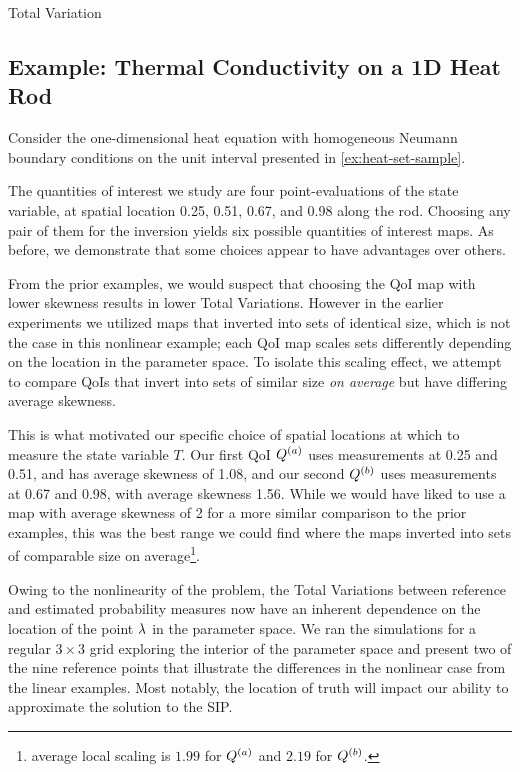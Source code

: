 Total Variation\subsection{Example: Thermal Conductivity on a 1D Heat Rod}\label{ex:heat-set-sample-accuracy}

Consider the one-dimensional heat equation with homogeneous Neumann boundary conditions on the unit interval presented in \ref{ex:heat-set-sample}.


The quantities of interest we study are four point-evaluations of the state variable, at spatial location 0.25, 0.51, 0.67, and 0.98 along the rod.
Choosing any pair of them for the inversion yields six possible quantities of interest maps.
As before, we demonstrate that some choices appear to have advantages over others.

From the prior examples, we would suspect that choosing the QoI map with lower skewness results in lower Total Variations.
However in the earlier experiments we utilized maps that inverted into sets of identical size, which is not the case in this nonlinear example; each QoI map scales sets differently depending on the location in the parameter space.
To isolate this scaling effect, we attempt to compare QoIs that invert into sets of similar size \emph{on average} but have differing average skewness.

This is what motivated our specific choice of spatial locations at which to measure the state variable $T$.
Our first QoI $Q^{(a)}$ uses measurements at 0.25 and 0.51, and has average skewness of 1.08, and our second $Q^{(b)}$ uses measurements at 0.67 and 0.98, with average skewness 1.56.
While we would have liked to use a map with average skewness of 2 for a more similar comparison to the prior examples, this was the best range we could find where the maps inverted into sets of comparable size on average\footnote{average local scaling is $1.99$ for $Q^{(a)}$ and $2.19$ for $Q^{(b)}$.}.

Owing to the nonlinearity of the problem, the Total Variations between reference and estimated probability measures now have an inherent dependence on the location of the point $\lambda$ in the parameter space.
We ran the simulations for a regular $3\times3$ grid exploring the interior of the parameter space and present two of the nine reference points that illustrate the differences in the nonlinear case from the linear examples.
Most notably, the location of truth will impact our ability to approximate the solution to the SIP.

